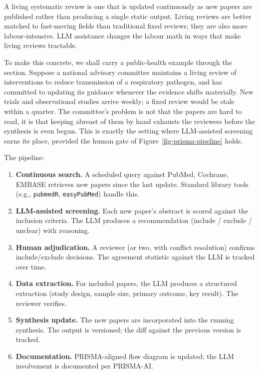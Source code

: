 \documentclass[
  letterpaper,
  11pt]{scrbook}
\providecommand{\tightlist}{%
  \setlength{\itemsep}{0pt}\setlength{\parskip}{0pt}}
\begin{document}
A living systematic review is one that is updated continuously as new
papers are published rather than producing a single static output.
Living reviews are better matched to fast-moving fields than traditional
fixed reviews; they are also more labour-intensive. LLM assistance
changes the labour math in ways that make living reviews tractable.

To make this concrete, we shall carry a public-health example through
the section. Suppose a national advisory committee maintains a living
review of interventions to reduce transmission of a respiratory
pathogen, and has committed to updating its guidance whenever the
evidence shifts materially. New trials and observational studies arrive
weekly; a fixed review would be stale within a quarter. The committee's
problem is not that the papers are hard to read, it is that keeping
abreast of them by hand exhausts the reviewers before the synthesis is
even begun. This is exactly the setting where LLM-assisted screening
earns its place, provided the human gate of
Figure~\ref{fig-prisma-pipeline} holds.

The pipeline:

\begin{enumerate}
\def\labelenumi{\arabic{enumi}.}
\tightlist
\item
  \textbf{Continuous search.} A scheduled query against PubMed,
  Cochrane, EMBASE retrieves new papers since the last update. Standard
  library tools (e.g., \texttt{pubmedR}, \texttt{easyPubMed}) handle
  this.
\item
  \textbf{LLM-assisted screening.} Each new paper's abstract is scored
  against the inclusion criteria. The LLM produces a recommendation
  (include / exclude / unclear) with reasoning.
\item
  \textbf{Human adjudication.} A reviewer (or two, with conflict
  resolution) confirms include/exclude decisions. The agreement
  statistic against the LLM is tracked over time.
\item
  \textbf{Data extraction.} For included papers, the LLM produces a
  structured extraction (study design, sample size, primary outcome, key
  result). The reviewer verifies.
\item
  \textbf{Synthesis update.} The new papers are incorporated into the
  running synthesis. The output is versioned; the diff against the
  previous version is tracked.
\item
  \textbf{Documentation.} PRISMA-aligned flow diagram is updated; the
  LLM involvement is documented per PRISMA-AI.
\end{enumerate}
\end{document}
